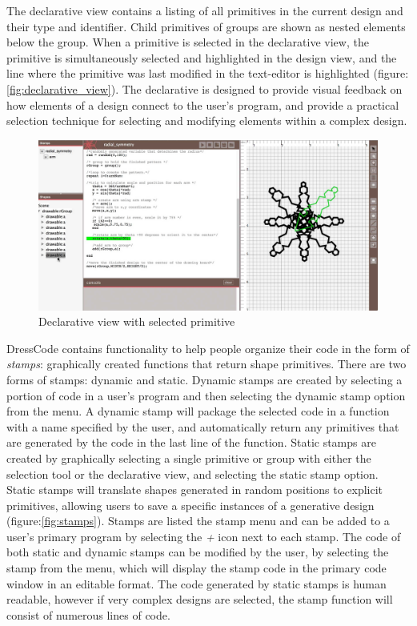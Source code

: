 \documentclass{sigchi}
\begin{document}
The declarative view contains a listing of all primitives in the current design and their type and identifier. Child primitives of groups are shown as nested elements below the group. When a primitive is selected in the declarative view, the primitive is simultaneously selected and highlighted in the design view, and the line where the primitive was last modified in the text-editor is highlighted (figure:\ref{fig:declarative_view}). The declarative is designed to provide visual feedback on how elements of a design connect to the user's program, and provide a practical selection technique for selecting and modifying elements within a complex design.

\begin{center}
\begin{figure}[h!]
\includegraphics[width=\columnwidth]{images/selection_mechanism.jpg}
\caption{Declarative view with selected primitive}
\label{fig:declarative view}
\end{figure}
\end{center}

DressCode contains functionality to help people organize their code in the form of \textit{stamps}: graphically created functions that return shape primitives. There are two forms of stamps: dynamic and static. Dynamic stamps are created by selecting a portion of code in a user's program and then selecting the dynamic stamp option from the menu. A dynamic stamp will package the selected code in a function with a name specified by the user, and automatically return any primitives that are generated by the code in the last line of the function. Static stamps are created by graphically selecting a single primitive or group with either the selection tool or the declarative view, and selecting the static stamp option. Static stamps will translate shapes generated in random positions to explicit primitives, allowing users to save a specific instances of a generative design (figure:\ref{fig:stamps}).  Stamps are listed the stamp menu and can be added to a user's primary program by selecting the \textit{+} icon next to each stamp. The code of both static and dynamic stamps can be modified by the user, by selecting the stamp from the menu, which will display the stamp code in the primary code window in an editable format. The code generated by static stamps is human readable, however if very complex designs are selected, the stamp function will consist of numerous lines of code.
\end{document}
